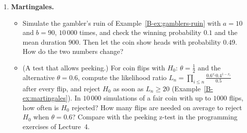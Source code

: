 \begin{enumerate}[label=\textbf{P\arabic*.}, leftmargin=*]
    \item \textbf{Martingales.}
    \begin{itemize}
        \item Simulate the gambler's ruin of Example~\ref{B-ex:gamblers-ruin} with $a = 10$ and $b = 90$, $10\,000$ times, and check the winning probability $0.1$ and the mean duration $900$. Then let the coin show heads with probability $0.49$. How do the two numbers change?
        \item (A test that allows peeking.) For coin flips with $H_0$: $\theta = \frac{1}{2}$ and the alternative $\theta = 0.6$, compute the likelihood ratio $L_n = \prod_{i \leq n}\frac{0.6^{x_i}0.4^{1 - x_i}}{0.5}$ after every flip, and reject $H_0$ as soon as $L_n \geq 20$ (Example~\ref{B-ex:martingales}). In $10\,000$ simulations of a fair coin with up to $1000$ flips, how often is $H_0$ rejected? How many flips are needed on average to reject $H_0$ when $\theta = 0.6$? Compare with the peeking z-test in the programming exercises of Lecture~4.
    \end{itemize}
\end{enumerate}
\endgroup
